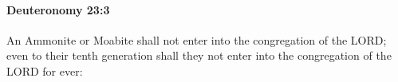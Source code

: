 
		\paragraph{Deuteronomy 23:3} %
			\label{DEUTERONOMY-23-3}

			An Ammonite or Moabite shall not enter into the congregation of the LORD; even to their tenth generation shall they not enter into the congregation of the LORD for ever:


